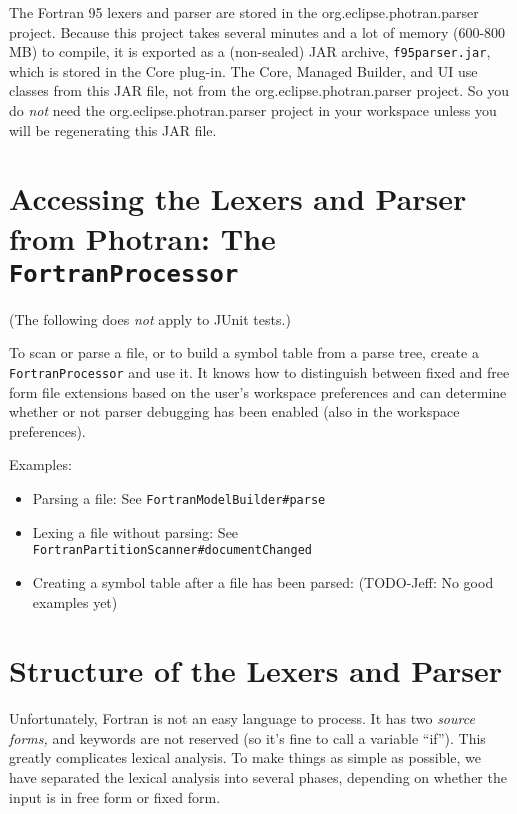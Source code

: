 
The Fortran 95 lexers and parser are stored in the org.eclipse.photran.parser
project.  Because this project takes several minutes and a lot of memory
(600-800 MB) to compile, it is exported as a (non-sealed) JAR archive,
\texttt{f95parser.jar}, which is stored in the Core plug-in.  The Core,
Managed Builder, and UI use classes from this JAR file, not from the
org.eclipse.photran.parser project.  So you do \textit{not} need the
org.eclipse.photran.parser project in your workspace unless you will be
regenerating this JAR file.

\section{Accessing the Lexers and Parser from Photran: The
         \texttt{FortranProcessor}}

(The following does \textit{not} apply to JUnit tests.)

To scan or parse a file, or to build a symbol table from a parse tree,
create a \texttt{FortranProcessor} and use it.  It knows how to distinguish
between fixed and free form file extensions based on the user's workspace
preferences and can determine whether or not parser debugging has been
enabled (also in the workspace preferences).

Examples:
\begin{itemize}
\item Parsing a file: See \texttt{FortranModelBuilder\#parse}
\item Lexing a file without parsing:
      See \texttt{FortranPartitionScanner\#documentChanged}
\item Creating a symbol table after a file has been parsed:
      (TODO-Jeff: No good examples yet)
\end{itemize}

\section{Structure of the Lexers and Parser}

Unfortunately, Fortran is not an easy language to process.  It has two
\textit{source forms,} and keywords are not reserved (so it's fine to call a
variable ``if'').  This greatly complicates lexical analysis.  To make
things as simple as possible, we have separated the lexical analysis into
several phases, depending on whether the input is in free form or fixed
form.


